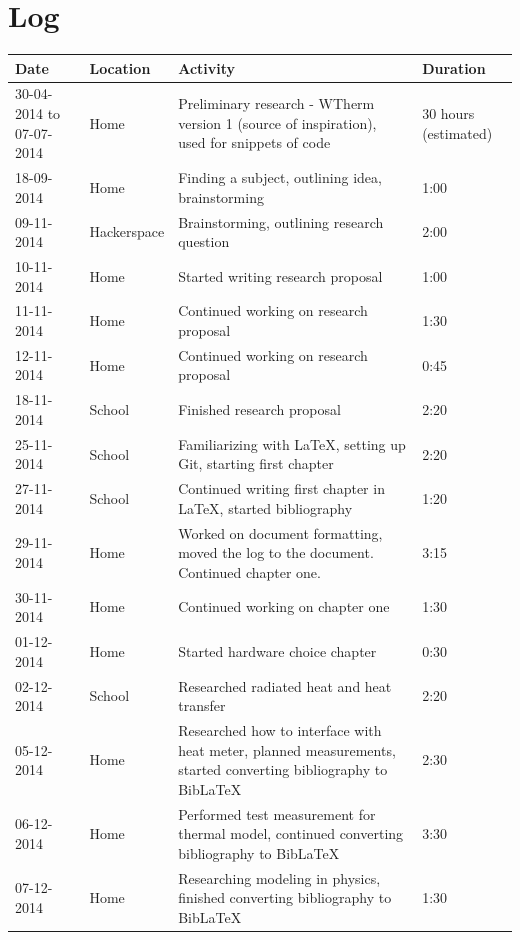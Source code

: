 \documentclass[12pt,a4paper,final]{report}
\begin{document}
\chapter{Log}
\begingroup
	\setlength{\LTleft}{-20cm plus -1fill}
	\setlength{\LTright}{\LTleft}
    \begin{longtable}{ | p{2.5cm} | p{2.5cm} | p{5cm} | p{2cm} |}
    \hline
    Date & Location & Activity & Duration \\ 
    \hline
    30-04-2014 to 07-07-2014 & Home & Preliminary research - WTherm version 1 (source of inspiration), used for snippets of code & 30 hours (estimated) \\ 
    \hline 
    18-09-2014 & Home & Finding a subject, outlining idea, brainstorming & 1:00 \\ 
    \hline
    09-11-2014 & Hackerspace & Brainstorming, outlining research question & 2:00 \\
    \hline
    10-11-2014 & Home & Started writing research proposal & 1:00 \\
	\hline
	11-11-2014 & Home & Continued working on research proposal & 1:30 \\
	\hline
	12-11-2014 & Home & Continued working on research proposal & 0:45	\\
	\hline
	18-11-2014 & School & Finished research proposal & 2:20	\\
	\hline
	25-11-2014 & School & Familiarizing with \LaTeX, setting up Git, starting first chapter & 2:20 \\
	\hline
	27-11-2014 & School & Continued writing first chapter in \LaTeX , started bibliography & 1:20 \\
	\hline
	29-11-2014 & Home & Worked on document formatting, moved the log to the document. Continued chapter one. & 3:15 \\
	\hline
	30-11-2014 & Home & Continued working on chapter one & 1:30 \\
	\hline
	01-12-2014 & Home & Started hardware choice chapter & 0:30 \\
	\hline
	02-12-2014 & School & Researched radiated heat and heat transfer & 2:20 \\
	\hline
	05-12-2014 & Home & Researched how to interface with heat meter, planned measurements, started converting bibliography to Bib\LaTeX{} & 2:30 \\
	\hline
	06-12-2014 & Home & Performed test measurement for thermal model, continued converting bibliography to Bib\LaTeX{} & 3:30 \\
	\hline
	07-12-2014 & Home & Researching modeling in physics, finished converting bibliography to Bib\LaTeX{} & 1:30 \\

\end{longtable}
\end{document}

